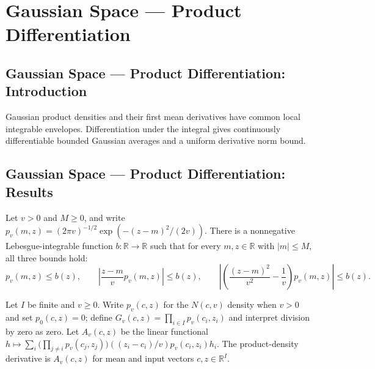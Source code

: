\section{Gaussian Space --- Product Differentiation}
\subsection*{Gaussian Space --- Product Differentiation: Introduction}
Gaussian product densities and their first mean derivatives have common local integrable envelopes. Differentiation under the integral gives continuously differentiable bounded Gaussian averages and a uniform derivative norm bound.

\subsection*{Gaussian Space --- Product Differentiation: Results}

\begin{lemma}
\leanok
{}
Let $v>0$ and $M\ge0$, and write $p_v(m,z)=(2\pi v)^{-1/2}\exp(-(z-m)^2/(2v))$. There is
a nonnegative Lebesgue-integrable function $b:\mathbb R\to\mathbb R$ such that for every
$m,z\in\mathbb R$ with $|m|\le M$, all three bounds hold:
\[p_v(m,z)\le b(z),\qquad \left|\frac{z-m}{v}p_v(m,z)\right|\le b(z),\qquad \left|\left(\frac{(z-m)^2}{v^2}-\frac1v\right)p_v(m,z)\right|\le b(z).\]
\end{lemma}

\begin{definition}
\leanok
Let $I$ be finite and $v\ge0$. Write $p_v(c,z)$ for the $N(c,v)$ density when $v>0$ and set $p_0(c,z)=0$; define $G_v(c,z)=\prod_{i\in I}p_v(c_i,z_i)$ and interpret division by zero as zero. Let $A_v(c,z)$ be the linear functional $h\mapsto\sum_i\bigl(\prod_{j\ne i}p_v(c_j,z_j)\bigr)((z_i-c_i)/v)p_v(c_i,z_i)h_i$. The product-density derivative is $A_v(c,z)$ for mean and input vectors $c,z\in\mathbb R^I$.
\end{definition}

